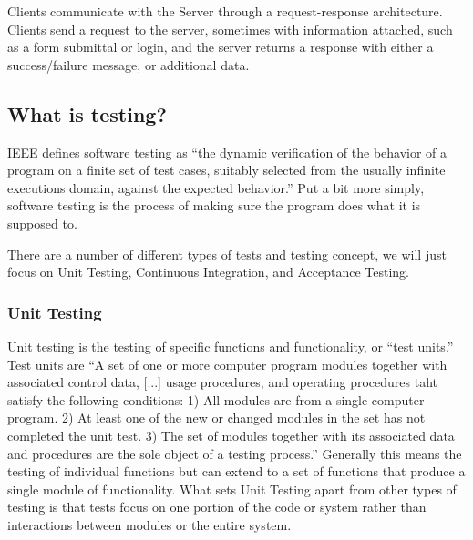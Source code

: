 \documentclass[11pt]{article}
\begin{document}
Clients communicate with the Server through a request-response architecture. Clients send a request to the server, sometimes with information attached, such as a form submittal or login, and the server returns a response with either a success/failure message, or additional data.


\subsection{What is testing?}
IEEE defines software testing as ``the dynamic verification of the behavior of a program on a finite set of test cases, suitably selected from the usually infinite executions domain, against the expected behavior.'' \cite{TestingDefinition} Put a bit more simply, software testing is the process of making sure the program does what it is supposed to.

There are a number of different types of tests and testing concept, we will just focus on Unit Testing, Continuous Integration, and Acceptance Testing.

\subsubsection{Unit Testing}
Unit testing is the testing of specific functions and functionality, or ``test units.'' Test units are ``A set of one or more computer program modules together with associated control data, [...] usage procedures, and operating procedures taht satisfy the following conditions: 1) All modules are from a single computer program. 2) At least one of the new or changed modules in the set has not completed the unit test. 3) The set of modules together with its associated data and procedures are the sole object of a testing process.'' \cite{UnitTestDefinition} Generally this means the testing of individual functions but can extend to a set of functions that produce a single module of functionality. What sets Unit Testing apart from other types of testing is that tests focus on one portion of the code or system rather than interactions between modules or the entire system.
\end{document}
